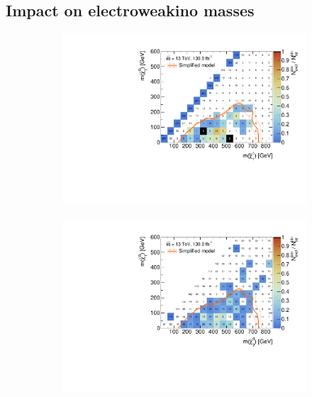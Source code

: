 \subsection{Impact on electroweakino masses}\label{sec:impact_electroweakino_masses}

 \begin{figure}
	\centering
	\begin{subfigure}[b]{0.5\linewidth}
		\centering\includegraphics[width=\textwidth]{cut_none/mchi1p_mlsp_contour}
		\caption{\label{fig:mchi1p_mlsp_contour}}
	\end{subfigure}\hfill
	\begin{subfigure}[b]{0.5\linewidth}
		\centering\includegraphics[width=\textwidth]{cut_none/mchi20_mlsp_contour}
		\caption{\label{fig:mchi20_mlsp_contour}}
	\end{subfigure}\hfill

\end{figure}
